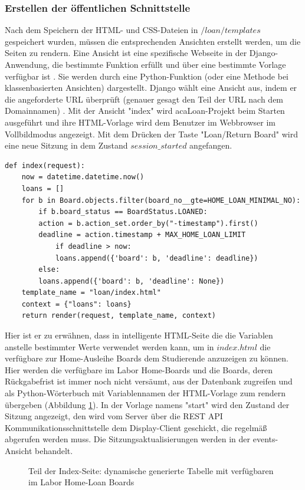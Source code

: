 \subsubsection{Erstellen der öffentlichen Schnittstelle}
\label{sec:server:design:views}
Nach dem Speichern der HTML- und CSS-Dateien in $/loan/templates$ gespeichert wurden, müssen  die entsprechenden Ansichten erstellt werden, um die Seiten zu rendern. Eine Ansicht ist eine spezifische Webseite in der Django-Anwendung, die bestimmte Funktion erfüllt und über eine bestimmte Vorlage verfügbar ist \cite{website:166:temp}. Sie werden durch eine Python-Funktion (oder eine Methode bei klassenbasierten Ansichten) dargestellt. Django wählt eine Ansicht aus, indem er die angeforderte URL überprüft (genauer gesagt den Teil der URL nach dem Domainnamen) \cite{website:166:temp}. Mit der Ansicht "index" wird acaLoan-Projekt beim Starten ausgeführt und ihre HTML-Vorlage wird dem Benutzer im Webbrowser im Vollbildmodus angezeigt. Mit dem Drücken der Taste "Loan/Return Board" wird eine neue Sitzung in dem Zustand $session\_started$ angefangen. 
\begin{lstlisting}[caption={Index-Ansicht in Django},captionpos=b]
def index(request):
	now = datetime.datetime.now()
	loans = []
	for b in Board.objects.filter(board_no__gte=HOME_LOAN_MINIMAL_NO):	
		if b.board_status == BoardStatus.LOANED:
		action = b.action_set.order_by("-timestamp").first()
		deadline = action.timestamp + MAX_HOME_LOAN_LIMIT	
			if deadline > now:
			loans.append({'board': b, 'deadline': deadline})
		else:
		loans.append({'board': b, 'deadline': None})	
	template_name = "loan/index.html"
	context = {"loans": loans}
	return render(request, template_name, context)
\end{lstlisting}
Hier ist er zu erwähnen, dass in intelligente HTML-Seite die die Variablen anstelle bestimmter Werte verwendet werden kann, um in $index.html$ die verfügbare zur Home-Ausleihe Boards dem Studierende anzuzeigen zu können. Hier werden die verfügbare im Labor Home-Boards und die Boards, deren Rückgabefrist ist immer noch nicht versäumt, aus der Datenbank zugreifen und als Python-Wörterbuch mit Variablennamen der HTML-Vorlage zum rendern übergeben (Abbildung \ref{fig:loaned}). In der Vorlage namens "start" wird den Zustand der Sitzung angezeigt, den wird vom Server über die REST API Kommunikationsschnittstelle dem Display-Client geschickt, die regelmäß abgerufen werden muss. Die Sitzungsaktualisierungen werden in der events-Ansicht behandelt. 

\begin{figure}[hb!]
	\centering
	\caption{Teil der Index-Seite: dynamische generierte Tabelle mit verfügbaren im Labor Home-Loan Boards}
	\label{fig:loaned}
\end{figure}

